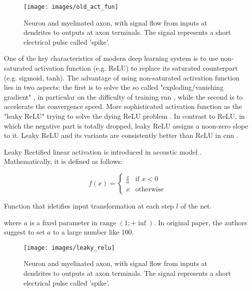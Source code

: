 \begin{figure}[H]
	\centering
	\texttt{[image: images/old\_act\_fun]}
	\caption[Image of a human neuron.]{Neuron and myelinated axon, with signal flow from inputs at dendrites to outputs at axon terminals. The signal represents a short electrical pulse called 'spike'.}
	\label{fig:old_act_fun}
\end{figure}

\noindent One of the key characteristics of modern deep learning system is to use non-saturated activation function (e.g. ReLU) to replace its saturated counterpart (e.g. sigmoid, tanh). The advantage of using non-saturated activation function lies in two aspects: the first is to solve the so called "exploding/vanishing gradient" \cite[]{bengio1994learning}, in particular on the difficulty of training \gls{rnn} \cite[]{pascanu2013difficulty}, while the second is to accelerate the convergence speed. More sophisticated activation function as the "leaky ReLU" trying to solve the dying ReLU problem \cite[]{LeakyReL95:online}. In contrast to ReLU, in which the negative part is totally dropped, leaky ReLU assigns a noon-zero slope to it. Leaky ReLU and its variants are consistently better than ReLU in \gls{cnn} \cite[]{xu2015empirical}.

\noindent Leaky Rectified linear activation is introduced in acoustic model \cite[]{maas2013rectifier}. Mathematically, it is defined as follows:

\begin{Equation}[H]
	\centering
	\begin{equation}
 		f(x) = 
			\begin{cases}
			\frac{x}{a} & \text{if $x < 0 $} \\
			x & \text{otherwise}
		\end{cases}
	\end{equation}
	\caption[Leaky Rectified linear activation.]{Function that idetifies input transformation at each step $l$ of the net.}
	\label{eq:activationfun}
\end{Equation}

\noindent where $a$ is a fixed parameter in range $(1; +\inf)$. In original paper, the authors suggest to set $a$ to a large number like $100$.

\begin{figure}[H]
	\centering
	\texttt{[image: images/leaky\_relu]}
	\caption[Leaky Rectified linear activation.]{Neuron and myelinated axon, with signal flow from inputs at dendrites to outputs at axon terminals. The signal represents a short electrical pulse called 'spike'.}
	\label{fig:leakyrelu}
\end{figure}

